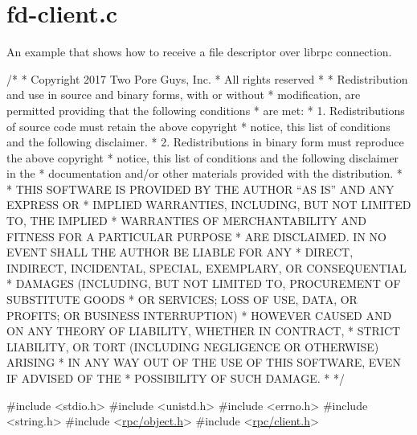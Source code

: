 \hypertarget{fd-client_8c-example}{}\section{fd-\/client.\+c}
An example that shows how to receive a file descriptor over librpc connection.


\begin{DoxyCodeInclude}
\textcolor{comment}{/*}
\textcolor{comment}{ * Copyright 2017 Two Pore Guys, Inc.}
\textcolor{comment}{ * All rights reserved}
\textcolor{comment}{ *}
\textcolor{comment}{ * Redistribution and use in source and binary forms, with or without}
\textcolor{comment}{ * modification, are permitted providing that the following conditions}
\textcolor{comment}{ * are met:}
\textcolor{comment}{ * 1. Redistributions of source code must retain the above copyright}
\textcolor{comment}{ *    notice, this list of conditions and the following disclaimer.}
\textcolor{comment}{ * 2. Redistributions in binary form must reproduce the above copyright}
\textcolor{comment}{ *    notice, this list of conditions and the following disclaimer in the}
\textcolor{comment}{ *    documentation and/or other materials provided with the distribution.}
\textcolor{comment}{ *}
\textcolor{comment}{ * THIS SOFTWARE IS PROVIDED BY THE AUTHOR ``AS IS'' AND ANY EXPRESS OR}
\textcolor{comment}{ * IMPLIED WARRANTIES, INCLUDING, BUT NOT LIMITED TO, THE IMPLIED}
\textcolor{comment}{ * WARRANTIES OF MERCHANTABILITY AND FITNESS FOR A PARTICULAR PURPOSE}
\textcolor{comment}{ * ARE DISCLAIMED.  IN NO EVENT SHALL THE AUTHOR BE LIABLE FOR ANY}
\textcolor{comment}{ * DIRECT, INDIRECT, INCIDENTAL, SPECIAL, EXEMPLARY, OR CONSEQUENTIAL}
\textcolor{comment}{ * DAMAGES (INCLUDING, BUT NOT LIMITED TO, PROCUREMENT OF SUBSTITUTE GOODS}
\textcolor{comment}{ * OR SERVICES; LOSS OF USE, DATA, OR PROFITS; OR BUSINESS INTERRUPTION)}
\textcolor{comment}{ * HOWEVER CAUSED AND ON ANY THEORY OF LIABILITY, WHETHER IN CONTRACT,}
\textcolor{comment}{ * STRICT LIABILITY, OR TORT (INCLUDING NEGLIGENCE OR OTHERWISE) ARISING}
\textcolor{comment}{ * IN ANY WAY OUT OF THE USE OF THIS SOFTWARE, EVEN IF ADVISED OF THE}
\textcolor{comment}{ * POSSIBILITY OF SUCH DAMAGE.}
\textcolor{comment}{ *}
\textcolor{comment}{ */}

\textcolor{preprocessor}{#include <stdio.h>}
\textcolor{preprocessor}{#include <unistd.h>}
\textcolor{preprocessor}{#include <errno.h>}
\textcolor{preprocessor}{#include <string.h>}
\textcolor{preprocessor}{#include <\hyperlink{object_8h}{rpc/object.h}>}
\textcolor{preprocessor}{#include <\hyperlink{client_8h}{rpc/client.h}>}


\end{DoxyCodeInclude}
